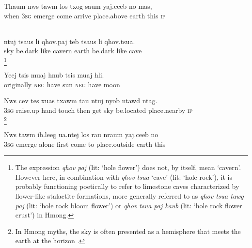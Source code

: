 \documentclass[output=paper]{LSP/langsci}
\begin{document}
 \begin{exe}
 \label{JaexApp6}
\gll Thaum nws tawm los txog saum yaj.ceeb no mas,\\
  when 3\textsc{sg} emerge come arrive place.above earth this \textsc{ip}\\
\glt {}\\
\end{exe}


 \begin{exe}
 \label{JaexApp7}
\gll ntuj tsaus li qhov.paj teb tsaus li qhov.tsua.\\
     sky be.dark like cavern earth be.dark like cave\\
\glt {}\footnote{The expression \textit{qhov paj} (lit: `hole flower') does not, by itself, mean `cavern'. However here, in combination with \textit{qhov tsua} `cave' (lit: `hole rock'), it is probably functioning poetically to refer to limestone caves characterized by flower-like stalactite formations, more generally referred to as \textit{qhov tsua tawg paj} (lit: `hole rock bloom flower') or \textit{qhov tsua paj kaub} (lit: `hole rock flower crust') in Hmong.} 
\end{exe} 
 
 \begin{exe}
 \label{JaexApp8}
\gll Yeej tsis muaj hnub tsis muaj hli.\\
     originally \textsc{neg} have sun \textsc{neg} have moon\\
\glt {}
\end{exe}

\begin{exe}
 \label{JaexApp9}
\gll Nws cev tes xuas txawm tau ntuj nyob ntawd ntag.\\
     3\textsc{sg} raise.up hand touch then get sky be.located place.nearby \textsc{ip}\\
\glt  {}\footnote{In Hmong myths, the sky is often presented as a hemisphere that meets the earth at the horizon \citep[][14, fn.2]{johnson92}.}
\end{exe}

\begin{exe}
 \label{JaexApp10}
\gll Nws tawm ib.leeg ua.ntej los rau nraum yaj.ceeb no\\
     3\textsc{sg} emerge alone first come to place.outside earth this\\
\glt  {}
\end{exe}
\end{document}
